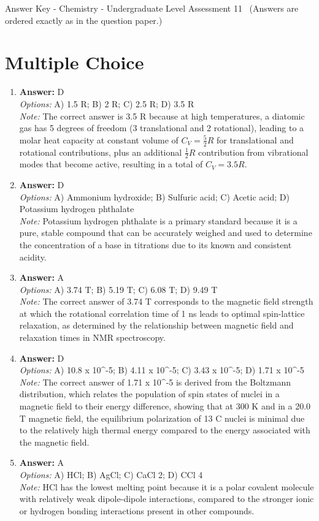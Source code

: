 \documentclass[12pt]{article}
\begin{document}
\begin{center}
Answer Key - Chemistry - Undergraduate Level Assessment 11 \
\small (Answers are ordered exactly as in the question paper.)
\end{center}

\section*{Multiple Choice}
\begin{enumerate}[label=\arabic*.]
\item \textbf{Answer:} D
\\ \textit{Options:} A) 1.5 R; B) 2 R; C) 2.5 R; D) 3.5 R
\\ \textit{Note:} The correct answer is 3.5 R because at high temperatures, a diatomic gas has 5 degrees of freedom (3 translational and 2 rotational), leading to a molar heat capacity at constant volume of \( C_V = \frac{5}{2}R \) for translational and rotational contributions, plus an additional \( \frac{1}{2}R \) contribution from vibrational modes that become active, resulting in a total of \( C_V = 3.5 R \).
\item \textbf{Answer:} D
\\ \textit{Options:} A) Ammonium hydroxide; B) Sulfuric acid; C) Acetic acid; D) Potassium hydrogen phthalate
\\ \textit{Note:} Potassium hydrogen phthalate is a primary standard because it is a pure, stable compound that can be accurately weighed and used to determine the concentration of a base in titrations due to its known and consistent acidity.
\item \textbf{Answer:} A
\\ \textit{Options:} A) 3.74 T; B) 5.19 T; C) 6.08 T; D) 9.49 T
\\ \textit{Note:} The correct answer of 3.74 T corresponds to the magnetic field strength at which the rotational correlation time of 1 ns leads to optimal spin-lattice relaxation, as determined by the relationship between magnetic field and relaxation times in NMR spectroscopy.
\item \textbf{Answer:} D
\\ \textit{Options:} A) 10.8 x 10^-5; B) 4.11 x 10^-5; C) 3.43 x 10^-5; D) 1.71 x 10^-5
\\ \textit{Note:} The correct answer of 1.71 x 10^-5 is derived from the Boltzmann distribution, which relates the population of spin states of nuclei in a magnetic field to their energy difference, showing that at 300 K and in a 20.0 T magnetic field, the equilibrium polarization of 13 C nuclei is minimal due to the relatively high thermal energy compared to the energy associated with the magnetic field.
\item \textbf{Answer:} A
\\ \textit{Options:} A) HCl; B) AgCl; C) CaCl 2; D) CCl 4
\\ \textit{Note:} HCl has the lowest melting point because it is a polar covalent molecule with relatively weak dipole-dipole interactions, compared to the stronger ionic or hydrogen bonding interactions present in other compounds.
\end{enumerate}
\end{document}
